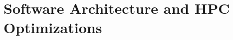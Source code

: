 \chapter{Software Architecture and HPC Optimizations}\label{chapter:software-arch-and-hpc-optimizations}

\lipsum[1-5]